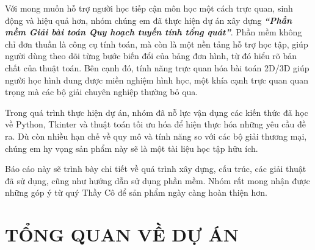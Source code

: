 \documentclass[12pt,a4paper]{article}
\begin{document}
Với mong muốn hỗ trợ người học tiếp cận môn học một cách trực quan, sinh động và hiệu quả hơn, nhóm chúng em đã thực hiện dự án xây dựng \textit{\textbf{“Phần mềm Giải bài toán Quy hoạch tuyến tính tổng quát”}}. Phần mềm không chỉ đơn thuần là công cụ tính toán, mà còn là một nền tảng hỗ trợ học tập, giúp người dùng theo dõi từng bước biến đổi của bảng đơn hình, từ đó hiểu rõ bản chất của thuật toán. Bên cạnh đó, tính năng trực quan hóa bài toán 2D/3D giúp người học hình dung được miền nghiệm hình học, một khía cạnh trực quan quan trọng mà các bộ giải chuyên nghiệp thường bỏ qua. 

Trong quá trình thực hiện dự án, nhóm đã nỗ lực vận dụng các kiến thức đã học về Python, Tkinter và thuật toán tối ưu hóa để hiện thực hóa những yêu cầu đề ra. Dù còn nhiều hạn chế về quy mô và tính năng so với các bộ giải thương mại, chúng em hy vọng sản phẩm này sẽ là một tài liệu học tập hữu ích. 

Báo cáo này sẽ trình bày chi tiết về quá trình xây dựng, cấu trúc, các giải thuật đã sử dụng, cũng như hướng dẫn sử dụng phần mềm. Nhóm rất mong nhận được những góp ý từ quý Thầy Cô để sản phẩm ngày càng hoàn thiện hơn.

\newpage
\section{TỔNG QUAN VỀ DỰ ÁN}
\end{document}

